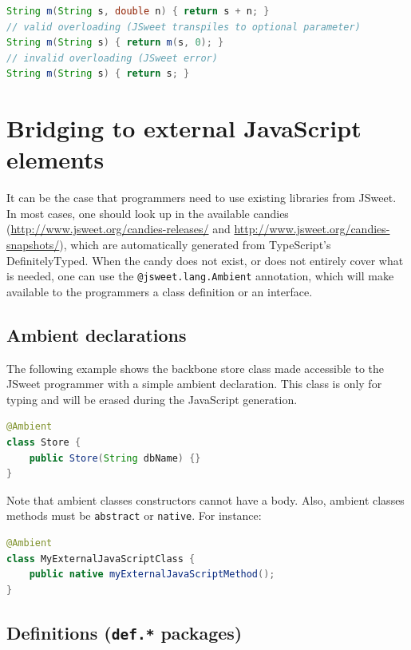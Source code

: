 \documentclass[a4paper]{report}
\begin{document}
\begin{lstlisting}[language=Java]
String m(String s, double n) { return s + n; }
// valid overloading (JSweet transpiles to optional parameter)
String m(String s) { return m(s, 0); }
// invalid overloading (JSweet error)
String m(String s) { return s; }
\end{lstlisting}

\chapter{Bridging to external JavaScript elements}

It can be the case that programmers need to use existing libraries from JSweet. In most cases, one should look up in the available candies (\url{http://www.jsweet.org/candies-releases/} and \url{http://www.jsweet.org/candies-snapshots/}), which are automatically generated from TypeScript's DefinitelyTyped. When the candy does not exist, or does not entirely cover what is needed, one can use the \texttt{@jsweet.lang.Ambient} annotation, which will make available to the programmers a class definition or an interface. 

\section{Ambient declarations}

The following example shows the backbone store class made accessible to the JSweet programmer with a simple ambient declaration. This class is only for typing and will be erased during the JavaScript generation.

\begin{lstlisting}[language=Java]
@Ambient
class Store {
	public Store(String dbName) {}
}
\end{lstlisting}

Note that ambient classes constructors cannot have a body. Also, ambient classes methods must be \texttt{abstract} or \texttt{native}. For instance:

\begin{lstlisting}[language=Java]
@Ambient
class MyExternalJavaScriptClass {
	public native myExternalJavaScriptMethod();
}
\end{lstlisting}

\section{Definitions (\texttt{def.*} packages)}
\end{document}
